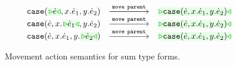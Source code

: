 \begin{figure}
\begin{displaymath}
\begin{array}{@{}rcl}
  \\
  \TABperformMove
      {      {\hcase{\zwsel{\hexp}}{x}{\hexp_1}{y}{\hexp_2}}}
      {\aMove{\dParent}}
      {\zwsel{\hcase{{\hexp}}{x}{\hexp_1}{y}{\hexp_2}}}
  \\
  \TABperformMove
      {      {\hcase{{\hexp}}{x}{\zwsel{\hexp_1}}{y}{\hexp_2}}}
      {\aMove{\dParent}}
      {\zwsel{\hcase{{\hexp}}{x}{\hexp_1}{y}{\hexp_2}}}
  \\
  \TABperformMove
      {      {\hcase{{\hexp}}{x}{\hexp_1}{y}{\zwsel{\hexp_2}}}}
      {\aMove{\dParent}}
      {\zwsel{\hcase{{\hexp}}{x}{\hexp_1}{y}{\hexp_2}}}
\end{array}
\end{displaymath}
\caption{Movement action semantics for sum type forms.}
\end{figure}


\iffalse
\begin{displaymath}
\begin{array}{@{}r@{~}l@{~~~}c@{~~~}ll@{~~}}
  \multicolumn{5}{l}{\textbf{Type Construction Actions for Sum Type}:}
  \\
  \TABperformTyp{\zwsel{\hehole}}{\aConstructx{\fsum}}
  {\tsum{\zwsel{\hehole}}{\hehole}}
  \\[3mm]
  \multicolumn{5}{l}{\textbf{Analytical Construction Actions for Sum Type}:}
  \\
  \TABperformAna{\hGamma}{\zwsel{\hehole}}
              {\tsum{\hehole}{\hehole}}
              {\aConstructx{\finj{i}}}
              {\hinj{i}{\zwsel{\hehole}}}
  \\
  \TABperformAna{\hGamma}{\zwsel{\hehole}}
              {\htau, \tincompat{\htau}{ \tsum{\hehole}{\hehole} }}
              {\aConstructx{\finj{i}}}
              {\hhole{\hinj{i}{\zwsel{\hehole}}}}
  \\
  \TABperformAna{\hGamma}{\zwsel{\hehole}}
              {\htau}
              {\aConstructx{\fcase{x}{y}}}
              {\hcase{\zwsel{\hehole}}{x}{\hehole}{y}{\hehole}}

\end{array}
\end{displaymath}
\fi
